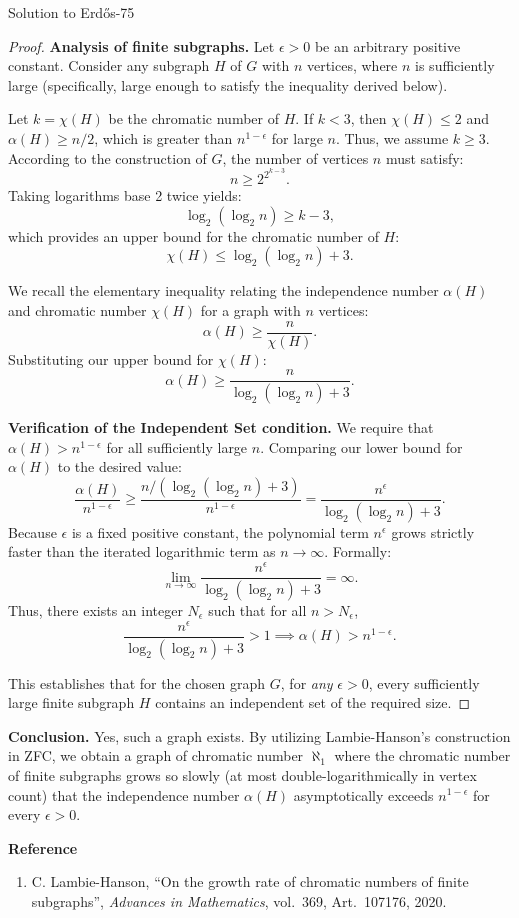 \documentclass{article}
\theoremstyle{plain}
\theoremstyle{definition}
\begin{document}
\begin{solution}{Solution to Erd\H{o}s-75}
\begin{proof}
\medskip
\textbf{Analysis of finite subgraphs.}
Let $\epsilon > 0$ be an arbitrary positive constant. Consider any subgraph $H$ of $G$ with $n$ vertices, where $n$ is sufficiently large (specifically, large enough to satisfy the inequality derived below).

Let $k = \chi(H)$ be the chromatic number of $H$. If $k < 3$, then $\chi(H) \le 2$ and $\alpha(H) \ge n/2$, which is greater than $n^{1-\epsilon}$ for large $n$. Thus, we assume $k \ge 3$.
According to the construction of $G$, the number of vertices $n$ must satisfy:
$$ n \ge 2^{2^{k-3}}. $$
Taking logarithms base 2 twice yields:
$$ \log_2(\log_2 n) \ge k - 3, $$
which provides an upper bound for the chromatic number of $H$:
$$ \chi(H) \le \log_2(\log_2 n) + 3. $$

We recall the elementary inequality relating the independence number $\alpha(H)$ and chromatic number $\chi(H)$ for a graph with $n$ vertices:
$$ \alpha(H) \ge \frac{n}{\chi(H)}. $$
Substituting our upper bound for $\chi(H)$:
$$ \alpha(H) \ge \frac{n}{\log_2(\log_2 n) + 3}. $$

\medskip
\noindent \textbf{Verification of the Independent Set condition.}
We require that $\alpha(H) > n^{1-\epsilon}$ for all sufficiently large $n$. Comparing our lower bound for $\alpha(H)$ to the desired value:
$$ \frac{\alpha(H)}{n^{1-\epsilon}} \ge \frac{n / (\log_2(\log_2 n) + 3)}{n^{1-\epsilon}} = \frac{n^\epsilon}{\log_2(\log_2 n) + 3}. $$
Because $\epsilon$ is a fixed positive constant, the polynomial term $n^\epsilon$ grows strictly faster than the iterated logarithmic term as $n \to \infty$. Formally:
$$ \lim_{n \to \infty} \frac{n^\epsilon}{\log_2(\log_2 n) + 3} = \infty. $$
Thus, there exists an integer $N_\epsilon$ such that for all $n > N_\epsilon$,
$$ \frac{n^\epsilon}{\log_2(\log_2 n) + 3} > 1 \implies \alpha(H) > n^{1-\epsilon}. $$

This establishes that for the chosen graph $G$, for \emph{any} $\epsilon > 0$, every sufficiently large finite subgraph $H$ contains an independent set of the required size.
\end{proof}

\medskip
\noindent \textbf{Conclusion.}
Yes, such a graph exists. By utilizing Lambie-Hanson's construction in ZFC, we obtain a graph of chromatic number $\aleph_1$ where the chromatic number of finite subgraphs grows so slowly (at most double-logarithmically in vertex count) that the independence number $\alpha(H)$ asymptotically exceeds $n^{1-\epsilon}$ for every $\epsilon > 0$.

\medskip
\textbf{Reference}
\begin{enumerate}
    \item \cite{LH20} C. Lambie-Hanson, ``On the growth rate of chromatic numbers of finite subgraphs'', \textit{Advances in Mathematics}, vol.~369, Art.~107176, 2020.
\end{enumerate}
\end{solution}
\end{document}
